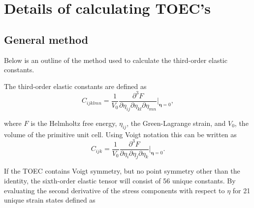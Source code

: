 \documentclass[showpacs,aps,floatfix,prb,reprint,superscriptaddress,onecolumn]{revtex4-1}
\begin{document}
\section{Details of calculating TOEC's}

\subsection{General method}
Below is an outline of the method used to calculate the third-order elastic constants.

The third-order elastic constants are defined as 
\begin{equation}
C_{ijklmn} = \frac{1}{V_0} \frac{\partial^3F}{\partial \eta_{ij} \partial \eta_{kl} \partial \eta_{mn}} | _ {\mathbf{\eta} = 0},
\end{equation}

where $F$ is the Helmholtz free energy, $\eta_{ij}$, the Green-Lagrange strain, and $V_0$, the volume of the primitive unit cell.  Using Voigt notation this can be written as
\begin{equation}
C_{ijk} = \frac{1}{V_0} \frac{\partial^3F}{\partial \eta_{i} \partial \eta_{j} \partial \eta_{k}} | _ {\mathbf{\eta} = 0}.
\end{equation}

If the TOEC contains Voigt symmetry, but no point symmetry other than the identity, the sixth-order elastic tensor will consist of 56 unique constants.  By evaluating the second derivative of the stress components with respect to $\eta$ for 21 unique strain states defined as 
\end{document}
